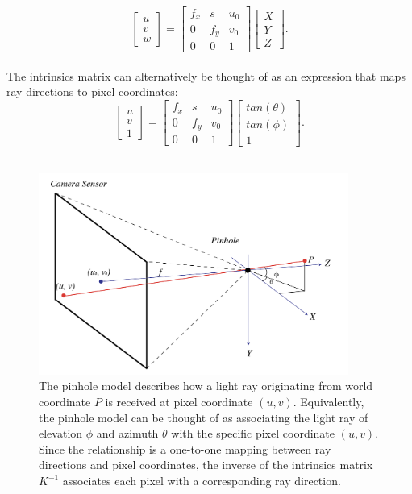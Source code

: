 \begin{equation}
\begin{bmatrix}
    u\\
    v\\
    w
\end{bmatrix} = 
\begin{bmatrix}
    f_x & s & u_0 \\ 
    0 & f_y  & v_0 \\ 
    0 & 0 & 1 
\end{bmatrix}
\begin{bmatrix}
    X \\
    Y \\
    Z
\end{bmatrix}.
\end{equation}\\
The intrinsics matrix can alternatively be thought of as an expression that maps ray directions to pixel coordinates:\\
\begin{equation}
\begin{bmatrix}
    u\\
    v\\
    1
\end{bmatrix} = 
\begin{bmatrix}
    f_x & s & u_0 \\ 
    0 & f_y  & v_0 \\ 
    0 & 0 & 1 
\end{bmatrix}
\begin{bmatrix}
    tan(\theta) \\
    tan(\phi) \\
    1
\end{bmatrix}.
\end{equation}\\
\begin{figure}[htbp]
    \centering 
    \includegraphics[width=4in]{images/pinhole.png}
    \caption[The pinhole model of the camera]{The pinhole model describes how a light ray originating from world coordinate $P$ is received at pixel coordinate $(u, v)$. Equivalently, the pinhole model can be thought of as associating the light ray of elevation $\phi$ and azimuth $\theta$ with the specific pixel coordinate $(u, v)$. Since the relationship is a one-to-one mapping between ray directions and pixel coordinates, the inverse of the intrinsics matrix $K^{-1}$ associates each pixel with a corresponding ray direction.}
\end{figure}

